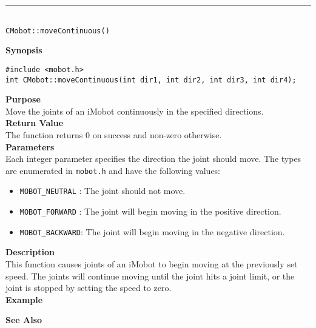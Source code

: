 \noindent
\vspace{5pt}
\rule{4.5in}{0.015in}\\
\noindent
{\LARGE \texttt{CMobot::moveContinuous()}}\\
{}

\noindent
{\bf Synopsis}\\
\begin{verbatim}
#include <mobot.h>
int CMobot::moveContinuous(int dir1, int dir2, int dir3, int dir4);
\end{verbatim}

\noindent
{\bf Purpose}\\
Move the joints of an iMobot continuously in the specified directions.\\

\noindent
{\bf Return Value}\\
The function returns 0 on success and non-zero otherwise.\\

\noindent
{\bf Parameters}\\
Each integer parameter specifies the direction the joint should move. The types
are enumerated in \texttt{mobot.h} and have the following values:
\begin{itemize}
\item \texttt{MOBOT\_NEUTRAL} : The joint should not move.
\item \texttt{MOBOT\_FORWARD} : The joint will begin moving in the positive direction.
\item \texttt{MOBOT\_BACKWARD}: The joint will begin moving in the negative direction.
\end{itemize}

\noindent
{\bf Description}\\
This function causes joints of an iMobot to begin moving at the previously set
speed. The joints will continue moving until the joint hits a joint limit, or
the joint is stopped by setting the speed to zero.\\

\noindent
{\bf Example}\\
\noindent

\noindent
{\bf See Also}\\

